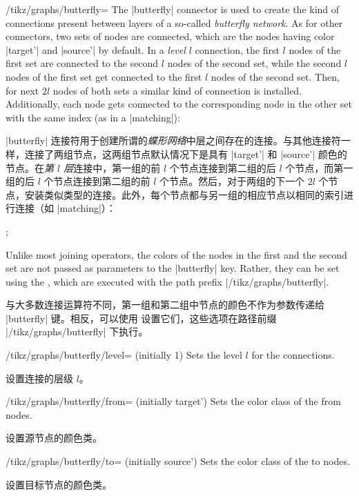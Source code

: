 \begin{key}{/tikz/graphs/butterfly=}
    The |butterfly| connector is used to create the kind of connections present
    between layers of a so-called \emph{butterfly network}. As for other
    connectors, two sets of nodes are connected, which are the nodes having
    color |target'| and |source'| by default. In a \emph{level $l$} connection,
    the first $l$ nodes of the first set are connected to the second $l$ nodes
    of the second set, while the second $l$ nodes of the first set get
    connected to the first $l$ nodes of the second set. Then, for next $2l$
    nodes of both sets a similar kind of connection is installed. Additionally,
    each node gets connected to the corresponding node in the other set with
    the same index (as in a |matching|):
    
    |butterfly| 连接符用于创建所谓的\emph{蝶形网络}中层之间存在的连接。与其他连接符一样，连接了两组节点，这两组节点默认情况下是具有 |target'| 和 |source'| 颜色的节点。在\emph{第 $l$ 层}连接中，第一组的前 $l$ 个节点连接到第二组的后 $l$ 个节点，而第一组的后 $l$ 个节点连接到第二组的前 $l$ 个节点。然后，对于两组的下一个 $2l$ 个节点，安装类似类型的连接。此外，每个节点都与另一组的相应节点以相同的索引进行连接（如 |matching|）：
\begin{codeexample}[preamble={\usetikzlibrary{graphs.standard}}]
\tikz {};
\end{codeexample}
    Unlike most joining operators, the colors of the nodes in the first and the
    second set are not passed as parameters to the |butterfly| key. Rather,
    they can be set using the , which are executed with the path
    prefix |/tikz/graphs/butterfly|.
    
    与大多数连接运算符不同，第一组和第二组中节点的颜色不作为参数传递给 |butterfly| 键。相反，可以使用  设置它们，这些选项在路径前缀 |/tikz/graphs/butterfly| 下执行。
    \begin{key}{/tikz/graphs/butterfly/level= (initially 1)}
        Sets the level $l$ for the connections.

        设置连接的层级 $l$。

    \end{key}
    \begin{key}{/tikz/graphs/butterfly/from= (initially target')}
        Sets the color class of the from nodes.

        设置源节点的颜色类。


    \end{key}
    \begin{key}{/tikz/graphs/butterfly/to= (initially source')}
        Sets the color class of the to nodes.

        设置目标节点的颜色类。


    \end{key}
\end{key}


